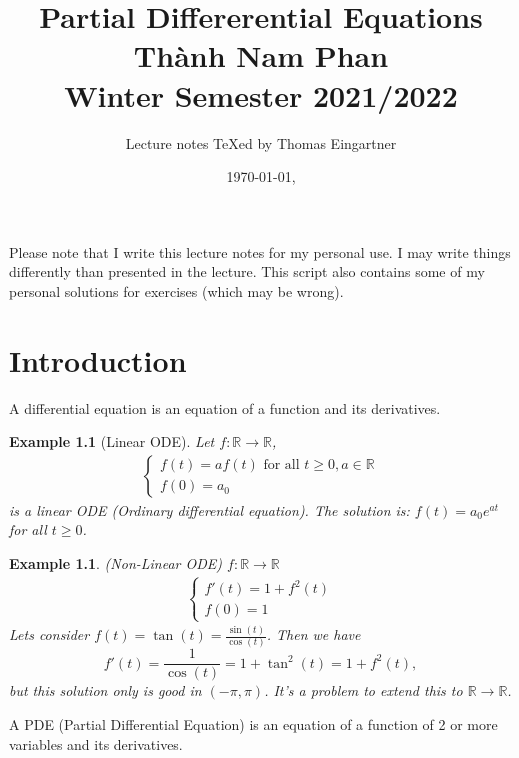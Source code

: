 \documentclass{report}
\title{Partial Differerential Equations \\ Thành Nam Phan \\ Winter Semester 2021/2022}
\author{Lecture notes \TeX{}ed by Thomas Eingartner}
\date{\today, \currenttime}
\theoremstyle{tommy}
\newtheorem{eg}[defn]{Example}
\begin{document}
  \maketitle
  \tableofcontents
  \newpage
  Please note that I write this lecture notes for my personal use. I may write things differently than presented in the lecture. This script also contains some of my personal solutions for exercises (which may be wrong).
  \newpage

  \chapter{Introduction}

  A differential equation is an equation of a function and its derivatives. 

  \begin{eg}[Linear ODE]
    Let \(f: \mathbb{R} \to \mathbb{R}\),
    \begin{align*}
      \begin{cases}
        f(t) = a f(t) \text{ for all } t \ge 0, a \in \mathbb{R} \\
        f(0) = a_0
      \end{cases}
    \end{align*}
    is a linear ODE (Ordinary differential equation). The solution is: \(f(t) = a_0 e^{at}\) for all \(t \ge 0\).
  \end{eg}

  \begin{eg} (Non-Linear ODE) \(f: \mathbb{R} \to \mathbb{R}\)
    \begin{align*}
      \begin{cases}
        f'(t) = 1 + f^2(t) \\
        f(0) = 1
      \end{cases}
    \end{align*}
    Lets consider \(f(t) = \tan(t) = \frac{\sin(t)}{\cos(t)}\). Then we have \[f'(t) = \frac{1}{\cos(t)} = 1 + \tan^2(t) = 1 + f^2(t),\] but this solution only is \emph{good} in \((- \pi, \pi)\). It's a problem to extend this to \(\mathbb{R} \to \mathbb{R}\).
  \end{eg}

  A PDE (Partial Differential Equation) is an equation of a function of 2 or more variables and its derivatives.
\end{document}
